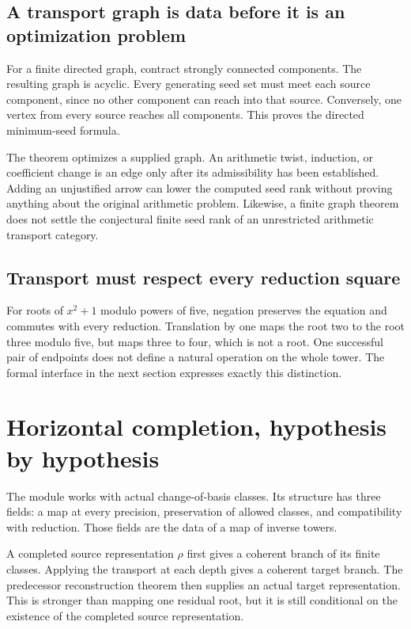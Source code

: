 \subsection{A transport graph is data before it is an optimization problem}
For a finite directed graph, contract strongly connected components. The resulting
graph is acyclic. Every generating seed set must meet each source component,
since no other component can reach into that source. Conversely, one vertex
from every source reaches all components. This proves the directed minimum-seed
formula.

The theorem optimizes a supplied graph. An arithmetic twist, induction, or
coefficient change is an edge only after its admissibility has been established.
Adding an unjustified arrow can lower the computed seed rank without proving
anything about the original arithmetic problem. Likewise, a finite graph theorem
does not settle the conjectural finite seed rank of an unrestricted arithmetic
transport category.

\subsection{Transport must respect every reduction square}
For roots of $x^2+1$ modulo powers of five, negation preserves the equation and
commutes with every reduction. Translation by one maps the root two to the root
three modulo five, but maps three to four, which is not a root. One successful
pair of endpoints does not define a natural operation on the whole tower.
The formal interface in the next section expresses exactly this distinction.

\clearpage
\section{Horizontal completion, hypothesis by hypothesis}
\label{sec:horizontal}
The module  works with actual
change-of-basis classes. Its structure  has three
fields: a map at every precision, preservation of allowed classes, and
compatibility with reduction. Those fields are the data of a map of inverse towers.

A completed source representation $\rho$ first gives a coherent branch of its
finite classes. Applying the transport at each depth gives a coherent target
branch. The predecessor reconstruction theorem then supplies an actual target
representation. This is stronger than mapping one residual root, but it is still
conditional on the existence of the completed source representation.

